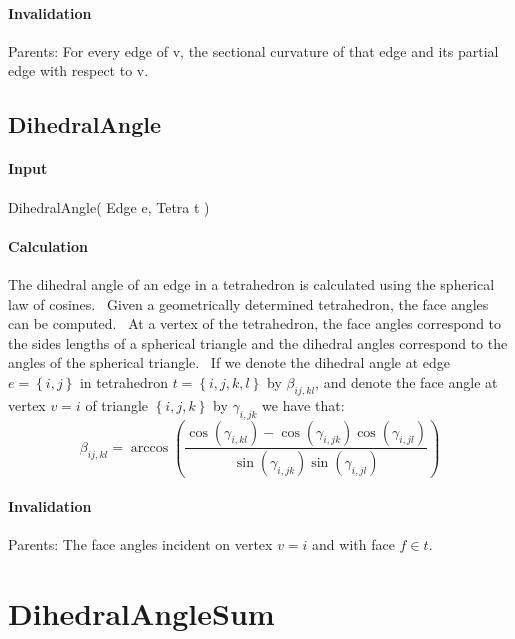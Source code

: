 \paragraph{Invalidation}

Parents: For every edge of v, the sectional curvature of that edge and its
partial edge with respect to v.\bigskip

\subsection{DihedralAngle}

\paragraph{Input}

DihedralAngle( Edge e, Tetra t )

\paragraph{Calculation}

The dihedral angle of an edge in a tetrahedron is calculated using the
spherical law of cosines. \ Given a geometrically determined tetrahedron,
the face angles can be computed. \ At a vertex of the tetrahedron, the face
angles correspond to the sides lengths of a spherical triangle and the
dihedral angles correspond to the angles of the spherical triangle. \ If we
denote the dihedral angle at edge $e=\left\{ i,j\right\} $ in tetrahedron $%
t=\left\{ i,j,k,l\right\} $ by $\beta _{ij,kl}$, and denote the face angle
at vertex $v=i$ of triangle $\left\{ i,j,k\right\} $ by $\gamma _{i,jk}$ we
have that:%
\begin{equation*}
\beta _{ij,kl}=\arccos \left( \frac{\cos \left( \gamma _{i,kl}\right) -\cos
\left( \gamma _{i,jk}\right) \cos \left( \gamma _{i,jl}\right) }{\sin \left(
\gamma _{i,jk}\right) \sin \left( \gamma _{i,jl}\right) }\right)
\end{equation*}

\paragraph{Invalidation}

\bigskip Parents: The face angles incident on vertex $v=i$ and with face $%
f\in t$.

\section{DihedralAngleSum}

